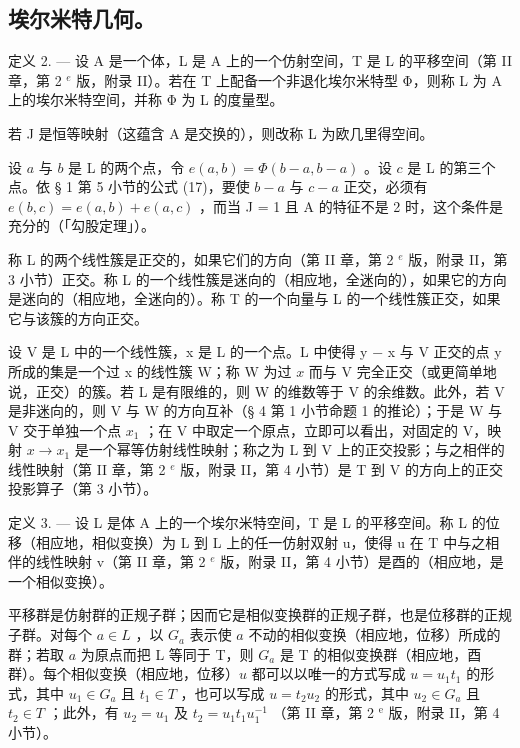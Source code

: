 \subsection{埃尔米特几何。}

定义 2. --- 设 A 是一个体，L 是 A 上的一个仿射空间，T 是 L 的平移空间（第 II 章，第 2 \(^{e}\) 版，附录 II）。若在 T 上配备一个非退化埃尔米特型 Φ，则称 L 为 A 上的埃尔米特空间，并称 Φ 为 L 的度量型。

若 J 是恒等映射（这蕴含 A 是交换的），则改称 L 为欧几里得空间。

设 \(a\) 与 \(b\) 是 L 的两个点，令 \(e(a, b) = \Phi(b - a, b - a)\) 。设 \(c\) 是 L 的第三个点。依 § 1 第 5 小节的公式 (17)，要使 \(b - a\) 与 \(c - a\) 正交，必须有 \(e(b, c) = e(a, b) + e(a, c)\) ，而当 J = 1 且 A 的特征不是 2 时，这个条件是充分的（「勾股定理」）。

称 L 的两个线性簇是正交的，如果它们的方向（第 II 章，第 2 \(^{e}\) 版，附录 II，第 3 小节）正交。称 L 的一个线性簇是迷向的（相应地，全迷向的），如果它的方向是迷向的（相应地，全迷向的）。称 T 的一个向量与 L 的一个线性簇正交，如果它与该簇的方向正交。

设 V 是 L 中的一个线性簇，x 是 L 的一个点。L 中使得 y − x 与 V 正交的点 y 所成的集是一个过 x 的线性簇 W；称 W 为过 \(x\) 而与 V 完全正交（或更简单地说，正交）的簇。若 L 是有限维的，则 W 的维数等于 V 的余维数。此外，若 V 是非迷向的，则 V 与 W 的方向互补（§ 4 第 1 小节命题 1 的推论）；于是 W 与 V 交于单独一个点 \(x_1\) ；在 V 中取定一个原点，立即可以看出，对固定的 V，映射 \(x \to x_1\) 是一个幂等仿射线性映射；称之为 L 到 V 上的正交投影；与之相伴的线性映射（第 II 章，第 2 \(^{e}\) 版，附录 II，第 4 小节）是 T 到 V 的方向上的正交投影算子（第 3 小节）。

定义 3. --- 设 L 是体 A 上的一个埃尔米特空间，T 是 L 的平移空间。称 L 的位移（相应地，相似变换）为 L 到 L 上的任一仿射双射 u，使得 u 在 T 中与之相伴的线性映射 v（第 II 章，第 2 \(^{e}\) 版，附录 II，第 4 小节）是酉的（相应地，是一个相似变换）。

平移群是仿射群的正规子群；因而它是相似变换群的正规子群，也是位移群的正规子群。对每个 \(a \in L\) ，以 \(G_a\) 表示使 \(a\) 不动的相似变换（相应地，位移）所成的群；若取 \(a\) 为原点而把 L 等同于 T，则 \(G_a\) 是 T 的相似变换群（相应地，酉群）。每个相似变换（相应地，位移）\(u\) 都可以以唯一的方式写成 \(u = u_1 t_1\) 的形式，其中 \(u_1 \in G_a\) 且 \(t_1 \in T\) ，也可以写成 \(u = t_2 u_2\) 的形式，其中 \(u_2 \in G_a\) 且 \(t_2 \in T\) ；此外，有 \(u_2 = u_1\) 及 \(t_2 = u_1 t_1 u_1^{-1}\) （第 II 章，第 2 \(^\text{e}\) 版，附录 II，第 4 小节）。

